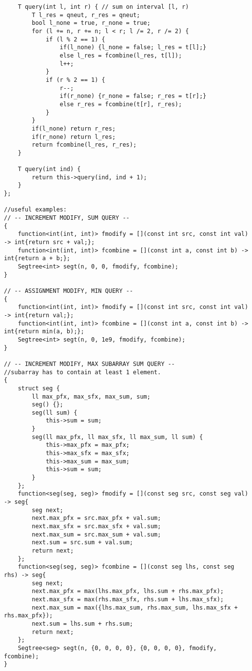 \documentclass[8pt, headheight=10pt, a4paper]{article}
\begin{document}
\begin{multicols*}{3}
\begin{lstlisting}
    T query(int l, int r) { // sum on interval [l, r)
        T l_res = qneut, r_res = qneut;
        bool l_none = true, r_none = true;
        for (l += n, r += n; l < r; l /= 2, r /= 2) {
            if (l % 2 == 1) {
                if(l_none) {l_none = false; l_res = t[l];}
                else l_res = fcombine(l_res, t[l]);
                l++;
            }
            if (r % 2 == 1) {
                r--;
                if(r_none) {r_none = false; r_res = t[r];}
                else r_res = fcombine(t[r], r_res);
            }
        }
        if(l_none) return r_res;
        if(r_none) return l_res;
        return fcombine(l_res, r_res);
    }

    T query(int ind) {
        return this->query(ind, ind + 1);
    }
};

//useful examples:
// -- INCREMENT MODIFY, SUM QUERY -- 
{
    function<int(int, int)> fmodify = [](const int src, const int val) -> int{return src + val;};
    function<int(int, int)> fcombine = [](const int a, const int b) -> int{return a + b;};
    Segtree<int> segt(n, 0, 0, fmodify, fcombine);
}

// -- ASSIGNMENT MODIFY, MIN QUERY -- 
{
    function<int(int, int)> fmodify = [](const int src, const int val) -> int{return val;};
    function<int(int, int)> fcombine = [](const int a, const int b) -> int{return min(a, b);};
    Segtree<int> segt(n, 0, 1e9, fmodify, fcombine); 
}

// -- INCREMENT MODIFY, MAX SUBARRAY SUM QUERY --
//subarray has to contain at least 1 element. 
{   
    struct seg {
        ll max_pfx, max_sfx, max_sum, sum;
        seg() {};
        seg(ll sum) {
            this->sum = sum;
        }
        seg(ll max_pfx, ll max_sfx, ll max_sum, ll sum) {
            this->max_pfx = max_pfx;
            this->max_sfx = max_sfx;
            this->max_sum = max_sum;
            this->sum = sum;
        }
    };
    function<seg(seg, seg)> fmodify = [](const seg src, const seg val) -> seg{
        seg next;
        next.max_pfx = src.max_pfx + val.sum;
        next.max_sfx = src.max_sfx + val.sum;
        next.max_sum = src.max_sum + val.sum;
        next.sum = src.sum + val.sum;
        return next;
    };
    function<seg(seg, seg)> fcombine = [](const seg lhs, const seg rhs) -> seg{
        seg next;
        next.max_pfx = max(lhs.max_pfx, lhs.sum + rhs.max_pfx);
        next.max_sfx = max(rhs.max_sfx, rhs.sum + lhs.max_sfx);
        next.max_sum = max({lhs.max_sum, rhs.max_sum, lhs.max_sfx + rhs.max_pfx});
        next.sum = lhs.sum + rhs.sum;
        return next;
    };
    Segtree<seg> segt(n, {0, 0, 0, 0}, {0, 0, 0, 0}, fmodify, fcombine);
}
\end{lstlisting}


\end{multicols*}
\end{document}
